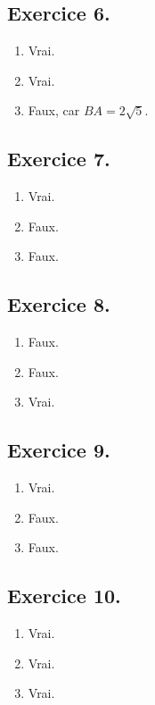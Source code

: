\documentclass{article}
\begin{document}
\vspace{1cm}

\begin{minipage}{0.4\textwidth}
\subsection*{Exercice 6.}
\begin{enumerate}[label=(\alph*)]
	\item Vrai.
	\item Vrai.
	\item Faux, car $BA=2\sqrt{5}$.
\end{enumerate}
\end{minipage}%
\begin{minipage}{0.3\textwidth}
	\subsection*{Exercice 7.}
	\begin{enumerate}[label=(\alph*)]
	\item Vrai.
	\item Faux.
	\item Faux.
\end{enumerate}
\end{minipage}%
\begin{minipage}{0.3\textwidth}
	\subsection*{Exercice 8.}
	\begin{enumerate}[label=(\alph*)]
	\item Faux.
	\item Faux.
	\item Vrai.
\end{enumerate}
\end{minipage}


\vspace{1cm}


\begin{minipage}{0.5\textwidth}
	\subsection*{Exercice 9.}
	\begin{enumerate}[label=(\alph*)]
	\item Vrai.
	\item Faux.
	\item Faux.
\end{enumerate}
\end{minipage}%
\begin{minipage}{0.5\textwidth}
	\subsection*{Exercice 10.}
	\begin{enumerate}[label=(\alph*)]
	\item Vrai.
	\item Vrai.
	\item Vrai.
\end{enumerate}
\end{minipage}
\end{document}
